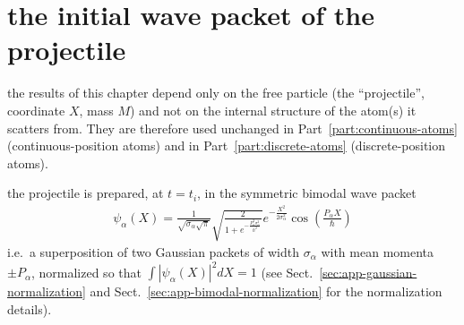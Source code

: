 \newpage
\section{the initial wave packet of the projectile}\label{sec:proj-wavepacket}

the results of this chapter depend only on the free particle (the ``projectile'', coordinate $X$, mass $M$) and not on the internal structure of the atom(s) it scatters from. They are therefore used unchanged in Part~\ref{part:continuous-atoms} (continuous-position atoms) and in Part~\ref{part:discrete-atoms} (discrete-position atoms).

the projectile is prepared, at $t=t_i$, in the symmetric bimodal wave packet
\begin{align}
  \psi_\alpha(X) = \frac{1}{\sqrt{\sigma_\alpha\sqrt{\pi}}}\sqrt{\frac{2}{1+e^{-\frac{P_\alpha^2\sigma_\alpha^2}{\hbar^2}}}}e^{-\frac{X^2}{2\sigma_\alpha^2}}\cos\left(\frac{P_\alpha X}{\hbar}\right)\label{eq:proj-psi-alpha}
\end{align}
i.e.\ a superposition of two Gaussian packets of width $\sigma_\alpha$ with mean momenta $\pm P_\alpha$, normalized so that $\int|\psi_\alpha(X)|^2dX=1$ (see Sect.~\ref{sec:app-gaussian-normalization} and Sect.~\ref{sec:app-bimodal-normalization} for the normalization details).

